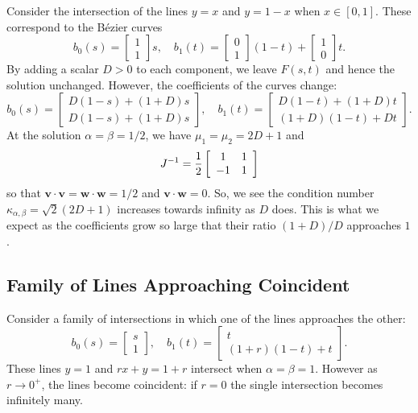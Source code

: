 \documentclass[3p, authoryear, square]{elsarticle}
\theoremstyle{definition}
\begin{document}
Consider the intersection of the lines \(y = x\) and \(y = 1 - x\) when
\(x \in \left[0, 1\right]\). These correspond to the B\'{e}zier curves
\begin{equation}
b_0(s) = \left[ \begin{array}{c} 1 \\ 1 \end{array}\right] s, \quad
b_1(t) = \left[ \begin{array}{c} 0 \\ 1 \end{array}\right] (1 - t) +
\left[ \begin{array}{c} 1 \\ 0 \end{array}\right] t.
\end{equation}
By adding a scalar \(D > 0\) to each component, we leave \(F(s, t)\) and hence
the solution unchanged. However, the coefficients of the curves change:
\begin{equation}
b_0(s) = \left[ \begin{array}{c} D(1 - s) + (1 + D)s \\ D(1 - s) + (1 + D)s
  \end{array}\right], \quad b_1(t) = \left[ \begin{array}{c}
  D(1 - t) + (1 + D)t \\ (1 + D)(1 - t) + Dt \end{array}\right].
\end{equation}
At the solution \(\alpha = \beta = 1/2\), we have \(\mu_1 = \mu_2 = 2D + 1\)
and
\begin{equation}
J^{-1} = \frac{1}{2}
\left[ \begin{array}{c c} 1 & 1 \\ -1 & 1 \end{array}\right]
\end{equation}
so that \(\bm{v} \cdot \bm{v} = \bm{w} \cdot \bm{w} =
1/2\) and \(\bm{v} \cdot \bm{w} = 0\).
So, we see the condition number \(\kappa_{\alpha, \beta} = \sqrt{2}(2D + 1)\)
increases towards infinity as \(D\) does. This is what we expect as the
coefficients grow so large that their ratio \((1 + D) / D\) approaches \(1\).

\subsection{Family of Lines Approaching Coincident}

Consider a family of intersections in which one of the lines approaches the
other:
\begin{equation}
b_0(s) = \left[ \begin{array}{c} s \\ 1 \end{array}\right], \quad
b_1(t) = \left[ \begin{array}{c} t \\ (1 + r)(1 - t) + t \end{array}\right].
\end{equation}
These lines \(y = 1\) and \(rx + y = 1 + r\) intersect when
\(\alpha = \beta = 1\). However as \(r \longrightarrow 0^+\), the lines
become coincident: if \(r = 0\) the single intersection becomes infinitely
many.
\end{document}
